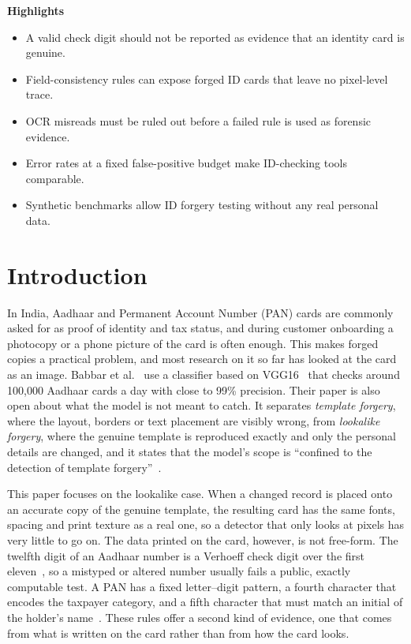 \documentclass[12pt]{article}
\begin{document}
\clearpage
\noindent\textbf{Highlights}
\begin{itemize}
  \item A valid check digit should not be reported as evidence that an identity card is genuine.
  \item Field-consistency rules can expose forged ID cards that leave no pixel-level trace.
  \item OCR misreads must be ruled out before a failed rule is used as forensic evidence.
  \item Error rates at a fixed false-positive budget make ID-checking tools comparable.
  \item Synthetic benchmarks allow ID forgery testing without any real personal data.
\end{itemize}

\clearpage
\linenumbers
\section{Introduction}
\label{sec:intro}

In India, Aadhaar and Permanent Account Number (PAN) cards are commonly asked for as proof of identity and tax status, and during customer onboarding a photocopy or a phone picture of the card is often enough. This makes forged copies a practical problem, and most research on it so far has looked at the card as an image. Babbar et al.~\cite{babbar} use a classifier based on VGG16~\cite{vgg} that checks around 100,000 Aadhaar cards a day with close to 99\% precision. Their paper is also open about what the model is not meant to catch. It separates \emph{template forgery}, where the layout, borders
or text placement are visibly wrong, from \emph{lookalike forgery},
where the genuine template is reproduced exactly and only the personal
details are changed, and it states that the model's scope is
``confined to the detection of template forgery''~\cite{babbar}.

This paper focuses on the lookalike case. When a changed record is placed onto an accurate copy of the genuine template, the resulting card has the same fonts, spacing and print texture as a real one, so a detector that only looks at pixels has very little to go on. The data printed on the card, however,
is not free-form. The twelfth digit of an Aadhaar number is a Verhoeff
check digit over the first eleven~\cite{uidai-scheme,verhoeff}, so a
mistyped or altered number usually fails a public, exactly computable
test. A PAN has a fixed letter--digit pattern, a fourth character that
encodes the taxpayer category, and a fifth character that must match an
initial of the holder's name~\cite{itd-pan,rule114}. These rules offer a second kind of evidence, one that comes from what is written on the card rather than from how the card looks.
\end{document}

